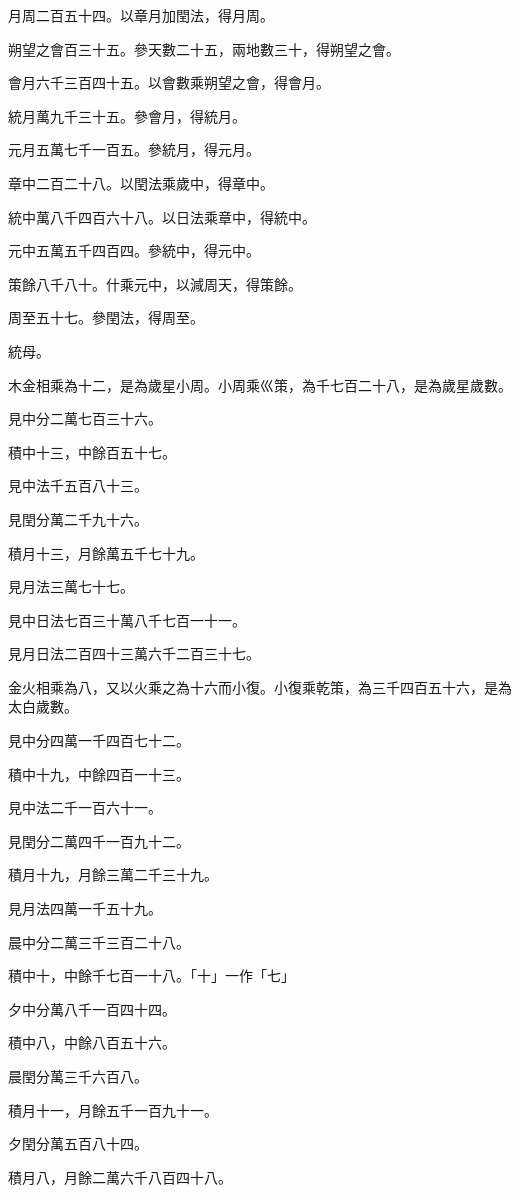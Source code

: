 \begin{pinyinscope}
月周二百五十四。以章月加閏法，得月周。

朔望之會百三十五。參天數二十五，兩地數三十，得朔望之會。

會月六千三百四十五。以會數乘朔望之會，得會月。

統月萬九千三十五。參會月，得統月。

元月五萬七千一百五。參統月，得元月。

章中二百二十八。以閏法乘歲中，得章中。

統中萬八千四百六十八。以日法乘章中，得統中。

元中五萬五千四百四。參統中，得元中。

策餘八千八十。什乘元中，以減周天，得策餘。

周至五十七。參閏法，得周至。

統母。

木金相乘為十二，是為歲星小周。小周乘巛策，為千七百二十八，是為歲星歲數。

見中分二萬七百三十六。

積中十三，中餘百五十七。

見中法千五百八十三。

見閏分萬二千九十六。

積月十三，月餘萬五千七十九。

見月法三萬七十七。

見中日法七百三十萬八千七百一十一。

見月日法二百四十三萬六千二百三十七。

金火相乘為八，又以火乘之為十六而小復。小復乘乾策，為三千四百五十六，是為太白歲數。

見中分四萬一千四百七十二。

積中十九，中餘四百一十三。

見中法二千一百六十一。

見閏分二萬四千一百九十二。

積月十九，月餘三萬二千三十九。

見月法四萬一千五十九。

晨中分二萬三千三百二十八。

積中十，中餘千七百一十八。「十」一作「七」

夕中分萬八千一百四十四。

積中八，中餘八百五十六。

晨閏分萬三千六百八。

積月十一，月餘五千一百九十一。

夕閏分萬五百八十四。

積月八，月餘二萬六千八百四十八。


\end{pinyinscope}
